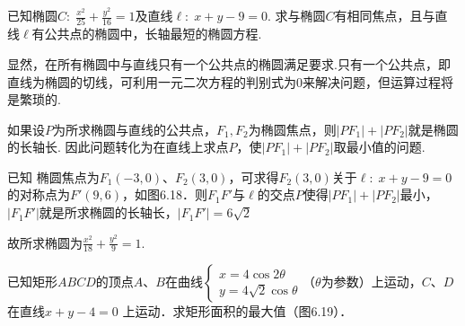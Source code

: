 \begin{example}
已知椭圆$C:\; \frac{x^2}{25}+\frac{y^2}{16}=1$及直线$\ell:\; x+y-9=0$. 求与椭圆$C$有相同焦点，且与直线$\ell$有公共点的椭圆中，长轴最短的椭圆方程.
\end{example}

\noindent
\begin{minipage}{.47\textwidth}
\CTEXindent


\begin{analyze}
显然，在所有椭圆中与直线只有一个公共点的椭圆满足要求.只有一个公共点，即直线为椭圆的切线，可利用一元二次方程的判别式为0来解决问题，但运算过程将是繁琐的.

如果设$P$为所求椭圆与直线的公共点，$F_1,F_2$为椭圆焦点，则$|PF_1|+|PF_2|$就是椭圆的长轴长. 因此问题转化为在直线上求点$P$，使$|PF_1|+|PF_2|$取最小值的问题.
\end{analyze}

\end{minipage}\hfill
\begin{minipage}{.5\textwidth}
    \centering
{}    
\end{minipage}

\begin{solution}
    已知 椭圆焦点为$F_1(-3,0)$、$F_2(3,0)$，可求得$F_2(3,0)$关于$\ell:\; x+y-9=0$的对称点为$F'(9,6)$，如图6.18．则$F_1F'$与$\ell$的交点$P$使得$|PF_1|+|PF_2|$最小，$|F_1F'|$就是所求椭圆的长轴长，$|F_1F'|=6\sqrt{2}$

故所求椭圆为$\frac{x^2}{18}+\frac{y^2}{9}=1$.
\end{solution}

\begin{example}
    已知矩形$ABCD$的顶点$A$、$B$在曲线$\begin{cases}
        x=4\cos2\theta \\ y=4\sqrt{2}\cos\theta
    \end{cases}$（$\theta$为参数）上运动，$C$、$D$在直线$x+y-4=0$
上运动．求矩形面积的最大值（图6.19）．
\end{example}

